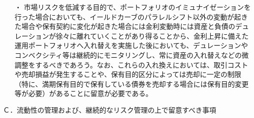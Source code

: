 \documentclass[report,gutter=10mm,fore-edge=10mm,uplatex,dvipdfmx]{jlreq}
\begin{document}
\begin{itemize}
 \item [・]  市場リスクを低減する目的で、ポートフォリオのイミュナイゼーションを行った場合においても、イールドカーブのパラレルシフト以外の変動が起きた場合や保有契約に変化が起きた場合には金利変動時には資産と負債のデュレーションが徐々に離れていくことがあり得ることから、金利上昇に備えた運用ポートフォリオへ入れ替えを実施した後においても、デュレーションやコンベクシティ等は継続的にモニタリングし、常に資産の入れ替えなどの微調整をするべきであろう。なお、これらの入れ換えにおいては、取引コストや売却損益が発生することや、保有目的区分によっては売却に一定の制限（特に、満期保有目的で保有している債券を売却する場合には保有目的変更等が必要）があることに留意が必要である。
\end{itemize}

Ｃ．流動性の管理および、継続的なリスク管理の上で留意すべき事項
\end{document}
